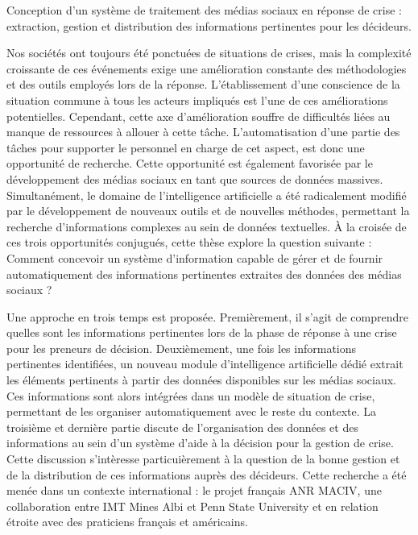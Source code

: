 \cleardoublepage
\pagestyle{empty}
\null
\newpage
{}%
{Conception d'un système de traitement des médias sociaux en réponse de crise : extraction, gestion et distribution des informations pertinentes pour les décideurs.}%
{
  Nos sociétés ont toujours été ponctuées de situations de crises, mais la complexité croissante de ces
  événements exige une amélioration constante des méthodologies et des outils employés lors de la réponse.
  L'établissement d'une conscience de la situation commune à tous les acteurs impliqués est l'une de ces améliorations
  potentielles.
  Cependant, cette axe d'amélioration souffre de difficultés liées au manque de ressources à allouer à cette tâche.
  L'automatisation d'une partie des tâches pour supporter le personnel en charge de cet aspect, est donc une opportunité de recherche.
  Cette opportunité est également favorisée par le développement des médias sociaux en tant que sources de données massives.
  Simultanément, le domaine de l'intelligence artificielle a été radicalement modifié par
  le développement de nouveaux outils et de nouvelles méthodes, permettant la recherche
  d'informations complexes au sein de données textuelles.
  À la croisée de ces trois opportunités conjugués, cette thèse explore la question suivante :
  Comment concevoir un système d'information capable de gérer et de fournir automatiquement
  des informations pertinentes extraites des données des médias sociaux ?

  Une approche en trois temps est proposée. Premièrement, il s'agit de comprendre
  quelles sont les informations pertinentes lors de la phase de réponse à une crise pour les preneurs de décision.
  Deuxièmement, une fois les informations pertinentes identifiées, un nouveau module d'intelligence
  artificielle dédié extrait les éléments pertinents à partir des données disponibles sur les médias sociaux.
  Ces informations sont alors intégrées dans un modèle de situation de crise, permettant
  de les organiser automatiquement avec le reste du contexte.
  La troisième et dernière partie discute de l'organisation des données et
  des informations au sein d'un système d'aide à la décision pour la gestion de crise.
  Cette discussion s'intèresse particuièrement à la question de la bonne gestion et de
  la distribution de ces informations auprès des décideurs.
  Cette recherche a été menée dans un contexte international : le projet français ANR
  MACIV, une collaboration entre IMT Mines Albi et Penn State University et en relation
  étroite avec des praticiens français et américains.

}
